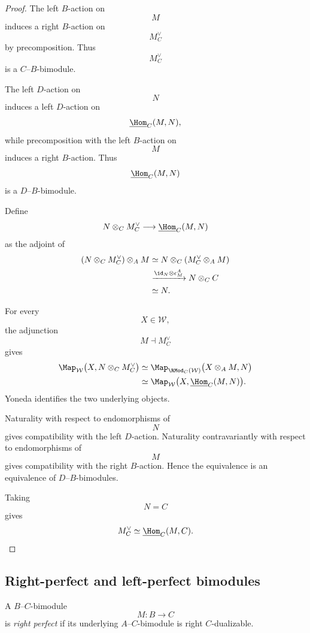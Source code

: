 \begin{proof}
The left $B$-action on
\[
    M
\]
induces a right $B$-action on
\[
    M_C^\vee
\]
by precomposition. Thus
\[
    M_C^\vee
\]
is a $C$--$B$-bimodule.

The left $D$-action on
\[
    N
\]
induces a left $D$-action on
\[
    \underline{\Hom}_C(M,N),
\]
while precomposition with the left $B$-action on
\[
    M
\]
induces a right $B$-action. Thus
\[
    \underline{\Hom}_C(M,N)
\]
is a $D$--$B$-bimodule.

Define
\[
    N\otimes_C M_C^\vee
    \longrightarrow
    \underline{\Hom}_C(M,N)
\]
as the adjoint of
\[
\begin{aligned}
    (N\otimes_C M_C^\vee)\otimes_A M
    &\simeq
    N\otimes_C
    (M_C^\vee\otimes_A M)
    \\
    &\xrightarrow{
        \id_N\otimes\epsilon_M^{A}
    }
    N\otimes_C C
    \\
    &\simeq
    N.
\end{aligned}
\]

For every
\[
    X\in\mathcal W,
\]
the adjunction
\[
    M\dashv M_C^\vee
\]
gives
\[
\begin{aligned}
    \Map_{\mathcal W}
    \bigl(
        X,
        N\otimes_C M_C^\vee
    \bigr)
    &\simeq
    \Map_{\RMod_C(\mathcal W)}
    \bigl(
        X\otimes_A M,
        N
    \bigr)
    \\
    &\simeq
    \Map_{\mathcal W}
    \bigl(
        X,
        \underline{\Hom}_C(M,N)
    \bigr).
\end{aligned}
\]
Yoneda identifies the two underlying objects.

Naturality with respect to endomorphisms of
\[
    N
\]
gives compatibility with the left $D$-action. Naturality
contravariantly with respect to endomorphisms of
\[
    M
\]
gives compatibility with the right $B$-action. Hence the equivalence is
an equivalence of $D$--$B$-bimodules.

Taking
\[
    N=C
\]
gives
\[
    M_C^\vee
    \simeq
    \underline{\Hom}_C(M,C).
\]
\end{proof}

\subsection{Right-perfect and left-perfect bimodules}

\begin{definition}
\label{def:right-perfect-bimodule}
A $B$--$C$-bimodule
\[
    M
    \colon
    B
    \longrightarrow
    C
\]
is \emph{right perfect} if its underlying $A$--$C$-bimodule is right
$C$-dualizable.
\end{definition}

